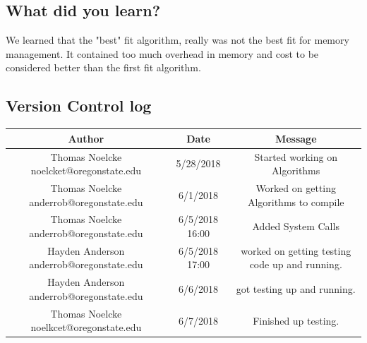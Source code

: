 \documentclass[draftclsnofoot, onecolumn, compsoc, 10pt]{IEEEtran}
\begin{document}
    \subsection{What did you learn?}
    We learned that the "best" fit algorithm, really was not the best fit for memory management. It contained too much overhead in memory and cost to be considered better than the first fit algorithm.\\

\newpage
\begin{landscape}

\section{Version Control log}
    \begin{center}
        \begin{tabular}{||c c c ||}
            \hline
            Author & Date & Message\\
            \hline \hline
            Thomas Noelcke noelcket@oregonstate.edu & 5/28/2018 & Started working on Algorithms\\
            \hline
            Thomas Noelcke anderrob@oregonstate.edu & 6/1/2018 & Worked on getting Algorithms to compile\\
            \hline
            Thomas Noelcke anderrob@oregonstate.edu & 6/5/2018 16:00 & Added System Calls\\
            \hline
            Hayden Anderson anderrob@oregonstate.edu & 6/5/2018 17:00 & worked on getting testing code up and running.\\
            \hline
            Hayden Anderson anderrob@oregonstate.edu & 6/6/2018 & got testing up and running.\\
            \hline
            Thomas Noelcke noelkcet@oregonstate.edu & 6/7/2018 & Finished up testing.\\
            \hline
        \end{tabular}
    \end{center}


\end{landscape}
\end{document}
